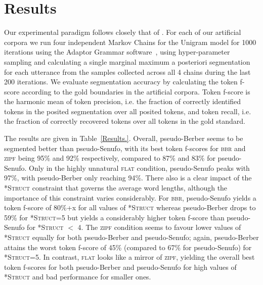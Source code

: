 \documentclass[11pt]{article}
\begin{document}
\section{Results}
\vspace*{-5pt}
Our experimental paradigm follows closely that of \cite{Johnson09a}. For each of our artificial corpora we run four independent Markov Chains for the Unigram model for 1000 iterations using the Adaptor Grammar software~\cite{Johnson07c}, using hyper-parameter sampling and calculating a single marginal maximum a posteriori segmentation for each utterance from the samples collected across all 4 chains during the last 200 iterations. We evaluate segmentation accuracy by calculating the token f-score according to the gold boundaries in the artificial corpora. Token f-score is the harmonic mean of token precision, i.e. the fraction of correctly identified tokens in the posited segmentation over all posited tokens, and token recall, i.e. the fraction of correctly recovered tokens over all tokens in the gold standard. 

The results are given in Table~\ref{Results.}. Overall, pseudo-Berber seems to be segmented better than pseudo-Senufo, with its best token f-scores for \textsc{bbr} and \textsc{zipf} being 95\% and 92\% respectively, compared to 87\% and 83\% for pseudo-Senufo. Only in the highly unnatural \textsc{flat} condition, pseudo-Senufo peaks with 97\%, with pseudo-Berber only reaching 94\%. There also is a clear impact of the \textsc{*Struct} constraint that governs the average word lengths, although the importance of this constraint varies considerably. For \textsc{bbr}, pseudo-Senufo yields a token f-score of 80\%+x for all values of \textsc{*Struct} whereas pseudo-Berber drops to 59\% for \textsc{*Struct}=5 but yields a considerably higher token f-score than pseudo-Senufo for \textsc{*Struct} $<$ 4. The \textsc{zipf} condition seems to favour lower values of \textsc{*Struct} equally for both pseudo-Berber and pseudo-Senufo; again, pseudo-Berber attains the worst token f-score of 45\% (compared to 67\% for pseudo-Senufo) for \textsc{*Struct}=5. In contrast, \textsc{flat} looks like a mirror of \textsc{zipf}, yielding the overall best token f-scores for both pseudo-Berber and pseudo-Senufo for high values of \textsc{*Struct} and bad performance for smaller ones.
\end{document}
